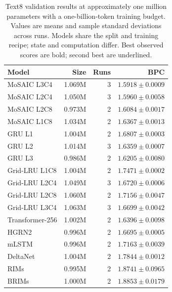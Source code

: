 \begin{table}[t]
\centering
\setlength{\tabcolsep}{4pt}
\caption{Text8 validation results at approximately one million parameters with a one-billion-token training budget. Values are means and sample standard deviations across runs. Models share the split and training recipe; state and computation differ. Best observed scores are bold; second best are underlined.}
\label{tab:mid}
\begin{tabular}{lrrr}
\toprule
Model & Size & Runs & BPC \\
\midrule
MoSAIC L3C4 & 1.069M & 3 & $\mathbf{1.5918\pm0.0009}$ \\
MoSAIC L2C4 & 1.050M & 3 & $\underline{1.5960\pm0.0058}$ \\
MoSAIC L2C8 & 0.973M & 2 & $1.6084\pm0.0017$ \\
MoSAIC L1C8 & 1.034M & 2 & $1.6367\pm0.0013$ \\
\midrule
GRU L1 & 1.004M & 2 & $1.6807\pm0.0003$ \\
GRU L2 & 1.014M & 3 & $1.6359\pm0.0007$ \\
GRU L3 & 0.986M & 2 & $1.6205\pm0.0080$ \\
\midrule
Grid-LRU L1C8 & 1.004M & 2 & $1.7471\pm0.0002$ \\
Grid-LRU L2C4 & 1.049M & 3 & $1.6720\pm0.0006$ \\
Grid-LRU L2C8 & 1.060M & 2 & $1.7156\pm0.0047$ \\
Grid-LRU L3C4 & 1.063M & 3 & $1.6699\pm0.0042$ \\
\midrule
Transformer-256 & 1.002M & 2 & $1.6396\pm0.0098$ \\
HGRN2 & 0.996M & 2 & $1.6695\pm0.0005$ \\
mLSTM & 0.996M & 2 & $1.7163\pm0.0039$ \\
DeltaNet & 1.004M & 2 & $1.7844\pm0.0012$ \\
\midrule
RIMs & 0.995M & 2 & $1.8741\pm0.0965$ \\
BRIMs & 1.000M & 2 & $1.8853\pm0.0179$ \\
\bottomrule
\end{tabular}
\end{table}
